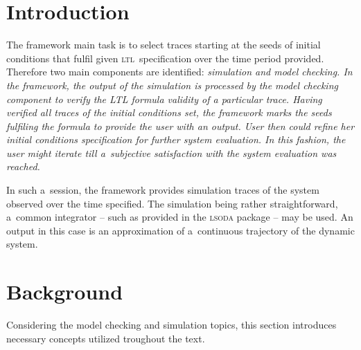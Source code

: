 \documentclass[12pt,oneside,draft]{fithesis}
\newcommand{\ltl}{\textsc{ltl}~}
\begin{document}
\FrontMatter
\ThesisTitlePage

\begin{ThesisDeclaration}
\DeclarationText
\AdvisorName
\end{ThesisDeclaration}




\MainMatter

\tableofcontents

\chapter{Introduction}
The framework main task is to select traces starting at the seeds of
initial conditions that fulfil given \ltl specification over the time
period provided. Therefore two main components are identified:
\em simulation and model checking\rm{}.
In the framework, the output of the simulation is processed by the
model checking component to verify the LTL formula validity of
a particular trace. Having verified all traces of the initial conditions
set, the framework marks the seeds fulfiling the formula to provide
the user with an output. User then could refine her initial conditions
specification for further system evaluation. In this fashion, the user
might iterate till a~subjective satisfaction with the system evaluation
was reached.

In such a~session, the framework provides simulation traces of the
system observed over the time specified. The simulation being rather
straightforward, a~common integrator -- such as provided in the
\textsc{lsoda} \cite{lsoda} package -- may be used.
An output in this case is an approximation of a~continuous trajectory
of the dynamic system.

\chapter{Background}
Considering the model checking and simulation topics, this section
introduces necessary concepts utilized troughout the text.
\end{document}
